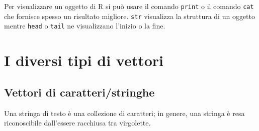 \documentclass[onecolumn,12pt]{book}\usepackage[]{graphicx}\usepackage[]{color}
\begin{document}
 
Per visualizzare un oggetto di \textsf{R} si pu\`o usare il comando \texttt{print} o il comando \texttt{cat} che fornisce spesso un risultato migliore. \texttt{str} visualizza la struttura di un oggetto mentre \texttt{head} o \texttt{tail} ne visualizzano l'inizio o la fine.


\section{I diversi  tipi di vettori}
\subsection{Vettori di caratteri/stringhe}
Una stringa di testo \`e una collezione di caratteri; in genere, una stringa \`e resa riconoscibile dall'essere racchiusa tra virgolette.
\end{document}
